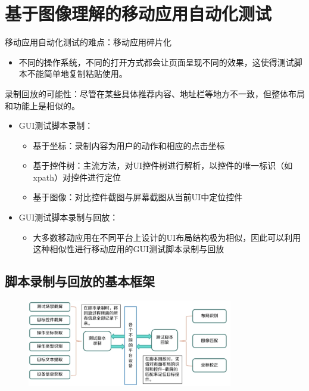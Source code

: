 \section{基于图像理解的移动应用自动化测试}

移动应用自动化测试的难点：移动应用碎片化
\begin{itemize}
    \item 不同的操作系统，不同的打开方式都会让页面呈现不同的效果，这使得测试脚本不能简单地复制粘贴使用。
\end{itemize}

录制回放的可能性：尽管在某些具体推荐内容、地址栏等地方不一致，但整体布局和功能上是相似的。

\begin{itemize}
    \item GUI测试脚本录制：
    \begin{itemize}
        \item 基于坐标：录制内容为用户的动作和相应的点击坐标
        \item 基于控件树：主流方法，对UI控件树进行解析，以控件的唯一标识（如xpath）对控件进行定位
        \item 基于图像：对比控件截图与屏幕截图从当前UI中定位控件
    \end{itemize}
    \item GUI测试脚本录制与回放：
    \begin{itemize}
        \item 大多数移动应用在不同平台上设计的UI布局结构极为相似，因此可以利用这种相似性进行移动应用的GUI测试脚本录制与回放
    \end{itemize}
\end{itemize}

\subsection{脚本录制与回放的基本框架}
\begin{figure}[H]
    \vspace{-0.5em}
	\centering
	\includegraphics[width=0.8\textwidth]{images/脚本录制与回放的基本框架.png}
    \vspace{-1em}
\end{figure}

